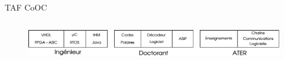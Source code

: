 \documentclass[t,compress,mathserif,12pt,xcolor=dvipsnames]{beamer}
\begin{document}
\begin{frame}[t]{TAF CoOC}
  \begin{minipage}[t][5.0cm][t]{\textwidth}
    \begin{columns}
      \begin{column}{0.63\textwidth}
        \vspace{-30pt}
      \end{column}
      \begin{column}{0.04\textwidth}

      \end{column}
      \begin{column}{0.33\textwidth}
      \end{column}
    \end{columns}
  \end{minipage}
  \begin{figure}[htp]
    \centering
    \includegraphics[width=\textwidth]{fig/frise}
  \end{figure}


\end{frame}
\end{document}
